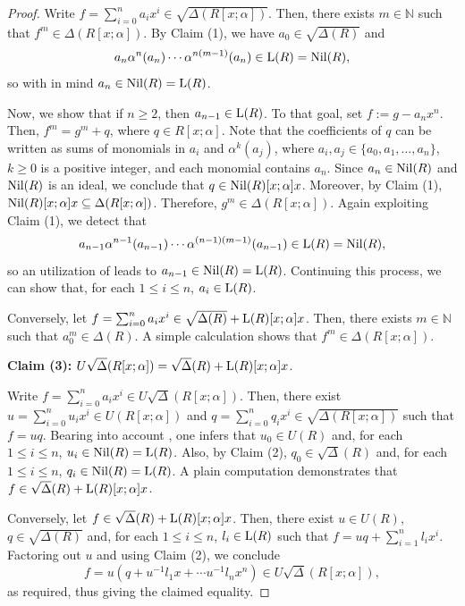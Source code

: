 \documentclass[11pt]{amsart}
\theoremstyle{definition}
\begin{document}
\begin{proof}
\medskip

Write $f=\sum_{i=0}^n a_ix^i \in \sqrt{\Delta(R[x; \alpha])}$. Then, there exists $m \in \mathbb{N}$ such that $f^m \in \Delta(R[x; \alpha])$. By Claim (1), we have $a_0 \in \sqrt{\Delta(R)}$ and $$a_n\alpha^{n}(a_n)\cdots \alpha^{n(m-1)}(a_n) \in {\rm L}(R)={\rm Nil}(R),$$ so with \cite[Lemma~2.1]{chen} in mind $a_n \in {\rm Nil}(R)={\rm L}(R)$.

Now, we show that if $n\geq 2$, then $a_{n-1} \in {\rm L}(R)$. To that goal, set $f:=g-a_nx^n$. Then, $f^m=g^m+q$, where $q \in R[x; \alpha]$. Note that the coefficients of $q$ can be written as sums of monomials in $a_i$ and $\alpha^{k}(a_j)$, where $a_i, a_j \in \{a_0, a_1, \ldots, a_n\}$, $k \geq 0$ is a positive integer, and each monomial contains $a_n$. Since $a_n \in {\rm Nil}(R)$ and ${\rm Nil}(R)$ is an ideal, we conclude that $q \in {\rm Nil}(R)[x; \alpha]x$. Moreover, by Claim (1), ${\rm Nil}(R)[x; \alpha]x \subseteq \Delta(R[x; \alpha])$. Therefore, $g^m \in \Delta(R[x; \alpha])$. Again exploiting Claim (1), we detect that $$a_{n-1}\alpha^{n-1}(a_{n-1})\cdots\alpha^{(n-1)(m-1)}(a_{n-1}) \in {\rm L}(R)={\rm Nil}(R),$$ so an utilization of \cite[Lemma~2.1]{chen} leads to $a_{n-1} \in {\rm Nil}(R)={\rm L}(R)$. Continuing this process, we can show that, for each $1 \leq i \leq n$, $a_i \in {\rm L}(R)$.

Conversely, let $f=\sum_{i=0}^n a_ix^i \in \sqrt{\Delta(R)} + {\rm L}(R)[x; \alpha]x$. Then, there exists $m \in \mathbb{N}$ such that $a_0^m \in \Delta(R)$. A simple calculation shows that $f^m \in \Delta(R[x; \alpha])$.

\medskip

\textbf{Claim (3):} $U\sqrt{\Delta}(R[x; \alpha]) = \sqrt{\Delta}(R) + {\rm L}(R)[x; \alpha]x$.

\medskip

Write $f=\sum_{i=0}^n a_ix^i \in U\sqrt{\Delta}(R[x; \alpha])$. Then, there exist $u=\sum_{i=0}^n u_ix^i \in U(R[x; \alpha])$ and $q=\sum_{i=0}^n q_ix^i \in \sqrt{\Delta(R[x; \alpha])}$ such that $f=uq$. Bearing into account \cite[Corollary~2.14]{chen}, one infers that $u_0 \in U(R)$ and, for each $1 \leq i \leq n$, $u_i \in {\rm Nil}(R) ={\rm L}(R)$. Also, by Claim (2), $q_0 \in \sqrt{\Delta}(R)$ and, for each $1 \leq i \leq n$, $q_i \in {\rm Nil}(R) ={\rm L}(R)$. A plain computation demonstrates that $f\in \sqrt{\Delta}(R) + {\rm L}(R)[x; \alpha]x$.

Conversely, let $f \in \sqrt{\Delta}(R) + {\rm L}(R)[x; \alpha]x$. Then, there exist $u \in U(R)$, $q \in \sqrt{\Delta(R)}$ and, for each $1 \leq i \leq n$, $l_i \in {\rm L}(R)$ such that $f=uq+\sum_{i=1}^{n}l_ix^i$. Factoring out $u$ and using Claim (2), we conclude $$f=u(q+u^{-1}l_1x + \cdots u^{-1}l_nx^n) \in U\sqrt{\Delta}(R[x; \alpha]),$$ as required, thus giving the claimed equality.
\end{proof}
\end{document}
